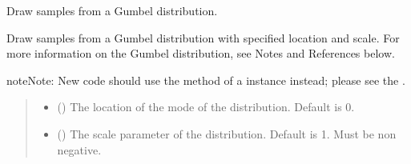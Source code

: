 \documentclass[letterpaper,10pt,english]{sphinxmanual}
\begin{document}
\begin{fulllineitems}
\label{\detokenize{metilda.controllers:metilda.controllers.pitch_art_wizard.gumbel}}
\pysigstartsignatures
{}
\pysigstopsignatures
\sphinxAtStartPar
Draw samples from a Gumbel distribution.

\sphinxAtStartPar
Draw samples from a Gumbel distribution with specified location and
scale.  For more information on the Gumbel distribution, see
Notes and References below.

\begin{sphinxadmonition}{note}{Note:}
\sphinxAtStartPar
New code should use the 
method of a  instance instead;
please see the .
\end{sphinxadmonition}
\begin{quote}\begin{description}
\begin{itemize}
\item {} 
\sphinxAtStartPar
{} (\sphinxstyleliteralemphasis{\sphinxupquote{, }}) \textendash{} The location of the mode of the distribution. Default is 0.

\item {} 
\sphinxAtStartPar
{} (\sphinxstyleliteralemphasis{\sphinxupquote{, }}) \textendash{} The scale parameter of the distribution. Default is 1. Must be non\sphinxhyphen{}
negative.


\end{itemize}
\end{description}
\end{quote}
\end{fulllineitems}
\end{document}
